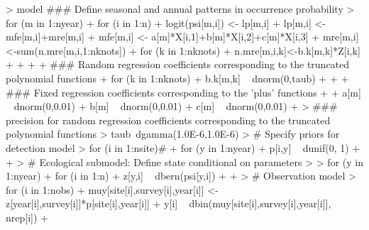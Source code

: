 \documentclass{article}
\begin{document}
\begin{Schunk}
\begin{Sinput}
>     model ### Define seasonal and annual patterns in occurrence probability
>     for (m in 1:nyear) {  
+     for (i in 1:n) {
+     logit(psi[m,i]) <- lp[m,i]
+     lp[m,i] <- mfe[m,i]+mre[m,i]
+     mfe[m,i] <- a[m]*X[i,1]+b[m]*X[i,2]+c[m]*X[i,3]
+     mre[m,i]<-sum(n.mre[m,i,1:nknots])
+     for (k in 1:nknots) {
+     n.mre[m,i,k]<-b.k[m,k]*Z[i,k]
+     }
+     }
+     
+     ### Random regression coefficients corresponding to the truncated polynomial functions
+     for (k in 1:nknots) {
+     b.k[m,k] ~ dnorm(0,taub)
+     }
+     
+     ### Fixed regression coefficients corresponding to the 'plus' functions
+     
+     a[m] ~ dnorm(0,0.01)
+     b[m] ~ dnorm(0,0.01)
+     c[m] ~ dnorm(0,0.01)
+     }
>     ### precision for random regression coefficients corresponding to the truncated polynomial functions
>     taub~dgamma(1.0E-6,1.0E-6)      
>     # Specify priors for detection model
>     for (i in 1:nsite){# 
+     for (y in 1:nyear) {
+     p[i,y] ~ dunif(0, 1)
+     }
+     }
>     # Ecological submodel: Define state conditional on parameters
>     
>     for (y in 1:nyear) {  
+     for (i in 1:n) {
+     z[y,i] ~ dbern(psi[y,i])
+     }    
+     }
>     # Observation model
>     for (i in 1:nobs){
+     muy[site[i],survey[i],year[i]] <- z[year[i],survey[i]]*p[site[i],year[i]]
+     y[i] ~ dbin(muy[site[i],survey[i],year[i]], nrep[i])
+     }
\end{Sinput}
\end{Schunk}
\pagebreak
\end{document}
